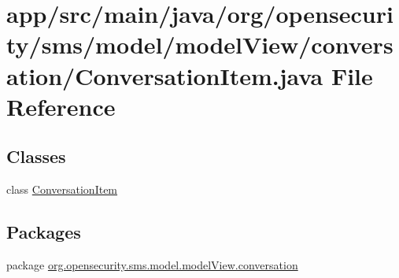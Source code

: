 \hypertarget{a00020}{\section{app/src/main/java/org/opensecurity/sms/model/model\+View/conversation/\+Conversation\+Item.java File Reference}
\label{a00020}
}
\subsection*{Classes}
\begin{DoxyCompactItemize}
\item 
class \hyperlink{a00008}{Conversation\+Item}
\end{DoxyCompactItemize}
\subsection*{Packages}
\begin{DoxyCompactItemize}
\item 
package \hyperlink{a00037}{org.\+opensecurity.\+sms.\+model.\+model\+View.\+conversation}
\end{DoxyCompactItemize}
